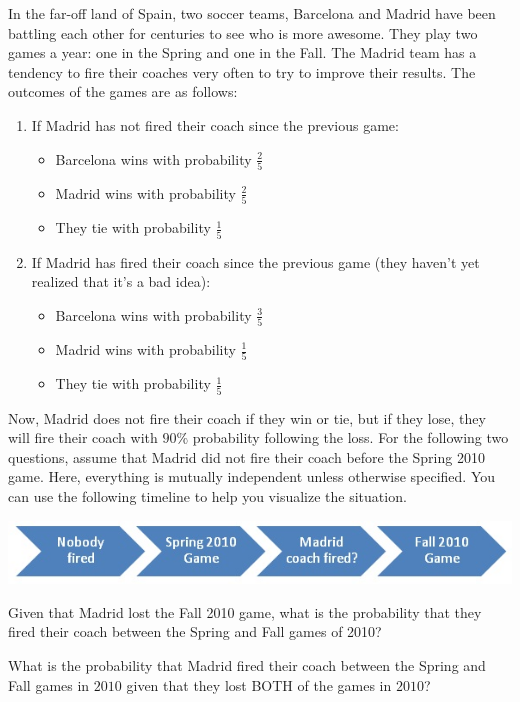 \documentclass[12pt,oneside]{article}
\begin{document}
\begin{problem}{20}
In the far-off land of Spain, two soccer teams, Barcelona and Madrid have been battling each other for centuries to see who is more awesome. They play two games a year: one in the Spring and one in the Fall. The Madrid team has a tendency to fire their coaches very often to try to improve their results. The outcomes of the games are as follows:
\begin{enumerate}
\item
If Madrid has not fired their coach since the previous game:
\begin{itemize}
\item
Barcelona wins with probability $\frac25$
\item
Madrid wins with probability $\frac25$
\item
They tie with probability $\frac15$
\end{itemize}
\item
If Madrid has fired their coach since the previous game (they haven't yet realized that it's a bad idea):
\begin{itemize}
\item
Barcelona wins with probability $\frac35$
\item
Madrid wins with probability $\frac15$
\item
They tie with probability $\frac15$
\end{itemize}
\end{enumerate}
Now, Madrid does not fire their coach if they win or tie, but if they lose, they will fire their coach with $90\%$ probability following the loss.
For the following two questions, assume that Madrid did not fire their coach before the Spring 2010 game.  Here, everything is mutually independent unless otherwise specified. You can use the following timeline to help you visualize the situation.

\begin{center}
\includegraphics{timeline.jpg}
\end{center}

\bparts
{}
Given that Madrid lost the Fall 2010 game, what is the probability that they fired their coach between the Spring and Fall games of 2010?

\newpage
{}
What is the probability that Madrid fired their coach between the Spring and Fall games in $2010$ given that they lost BOTH of the games in $2010$?
\eparts
\end{problem}
\end{document}
